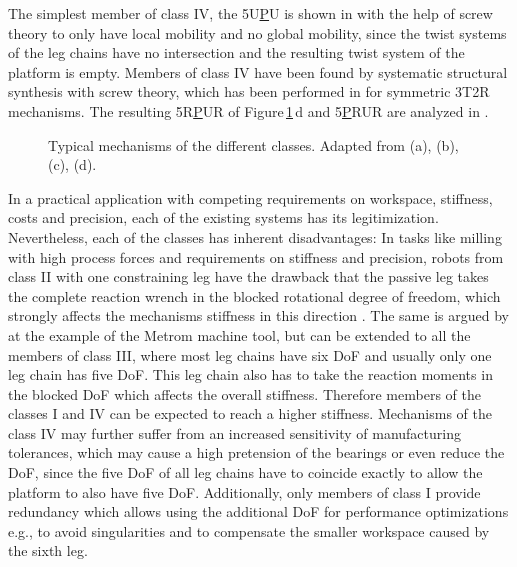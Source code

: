 \documentclass[robotics,article,accept,moreauthors,pdftex]{Definitions/mdpi}
\begin{document}
The simplest member of class IV, the 5U\underline{P}U is shown in \cite{HuangLi2002} with the help of screw theory to only have local mobility and no global mobility, since the twist systems of the leg chains have no intersection and the resulting twist system of the platform is empty.
Members of class IV have been found by systematic structural synthesis with screw theory, which has been performed in \cite{KongGos2005} for symmetric 3T2R mechanisms.
The resulting 5R\underline{P}UR of Figure\,\ref{fig:systems_pictures}\,d and 5\underline{P}RUR are analyzed in \cite{Tale-MasoulehGos2011,Tale-MasoulehSaaGosTag2010}.
%
\begin{figure}[H]
	
	\vspace{0.3cm} %
	\caption{Typical mechanisms of the different classes. Adapted from \cite{ZhangGos2001} (a), \cite{MbarekNefCor2005} (b), \cite{AlaghebandMahMilBen2015} (c), \cite{Tale-MasoulehGos2011} (d).}
	\label{fig:systems_pictures}
\end{figure} 

In a practical application with competing requirements on workspace, stiffness, costs and precision, each of the existing systems has its legitimization.
Nevertheless, each of the classes has inherent disadvantages:
In tasks like milling with high process forces and requirements on stiffness and precision, robots from class II with one constraining leg have the drawback that the passive leg takes the complete reaction wrench in the blocked rotational degree of freedom, which strongly affects the mechanisms stiffness in this direction \cite{ZhangGos2001}.
The same is argued by \cite{LinLiYanZha2013} at the example of the Metrom machine tool, but can be extended to all the members of class III, where most leg chains have six DoF and usually only one leg chain has five DoF.
This leg chain also has to take the reaction moments in the blocked DoF which affects the overall stiffness.
Therefore\added[id=Sp]{,} members of the classes I and IV can be expected to reach a higher stiffness.
Mechanisms of the class IV may further suffer from an increased sensitivity of manufacturing tolerances, which may cause a high pretension of the bearings or even reduce the DoF, since the five DoF of all leg chains have to coincide exactly to allow the platform to also have five DoF.
Additionally, only members of class I provide redundancy which allows using the additional DoF for performance optimizations\added[id=Sp]{,} e.g., to avoid singularities and to compensate the smaller workspace caused by the sixth leg.
\end{document}
